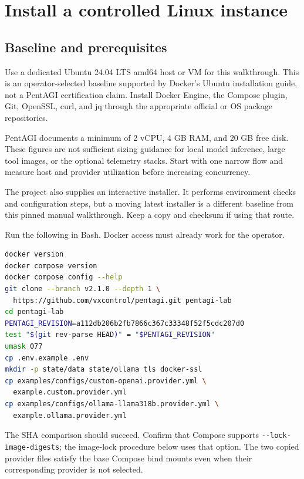 \documentclass[11pt,letterpaper]{article}
\newcommand{\code}[1]{\nolinkurl{#1}}
\newcommand{\src}[1]{\cite{#1}}
\newcommand{\smallhead}[1]{\par\medskip{\sffamily\bfseries\color{Navy}#1}\par}
\begin{document}
\clearpage
\section{Install a controlled Linux instance}
\label{sec:install}
\subsection{Baseline and prerequisites}
Use a dedicated Ubuntu 24.04 LTS amd64 host or VM for this walkthrough. This is
an operator-selected baseline supported by Docker's Ubuntu installation guide,
not a PentAGI certification claim. Install Docker Engine, the Compose plugin,
Git, OpenSSL, curl, and jq through the appropriate official or OS package
repositories. \src{docker-install}

PentAGI documents a minimum of 2 vCPU, 4 GB RAM, and 20 GB free disk.
These figures are not sufficient sizing guidance for local model inference,
large tool images, or the optional telemetry stacks. Start with one narrow flow
and measure host and provider utilization before increasing concurrency.
\src{readme}

The project also supplies an interactive installer. It performs environment
checks and configuration steps, but a moving latest installer is a different
baseline from this pinned manual walkthrough. Keep a copy and checksum if using
that route. \src{installer}

\smallhead{Step 1. Verify the host and obtain the source}
Run the following in Bash. Docker access must already work for the operator.
\begin{lstlisting}[language=bash]
docker version
docker compose version
docker compose config --help
git clone --branch v2.1.0 --depth 1 \
  https://github.com/vxcontrol/pentagi.git pentagi-lab
cd pentagi-lab
PENTAGI_REVISION=a112db206b2fb7866c367c33348f52f5cdc207d0
test "$(git rev-parse HEAD)" = "$PENTAGI_REVISION"
umask 077
cp .env.example .env
mkdir -p state/data state/ollama tls docker-ssl
cp examples/configs/custom-openai.provider.yml \
  example.custom.provider.yml
cp examples/configs/ollama-llama318b.provider.yml \
  example.ollama.provider.yml
\end{lstlisting}
The SHA comparison should succeed. Confirm that Compose supports
\code{--lock-image-digests}; the image-lock procedure below uses that option.
The two copied provider files satisfy the base Compose bind mounts even when
their corresponding provider is not selected. \src{release,compose,compose-config}
\end{document}
